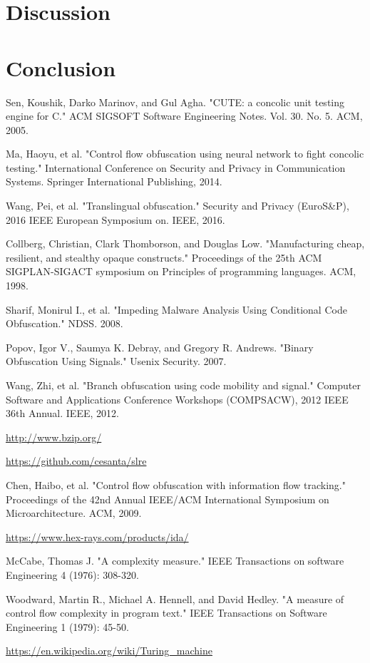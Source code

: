 \documentclass[lnicst]{svmultln}
\begin{document}
\section{Discussion}
\section{Conclusion}

%
%
\begin{thebibliography}{5}

 Sen, Koushik, Darko Marinov, and Gul Agha. "CUTE: a concolic unit testing engine for C." ACM SIGSOFT Software Engineering Notes. Vol. 30. No. 5. ACM, 2005.

 Ma, Haoyu, et al. "Control flow obfuscation using neural network to fight concolic testing." International Conference on Security and Privacy in Communication Systems. Springer International Publishing, 2014.

 Wang, Pei, et al. "Translingual obfuscation." Security and Privacy (EuroS\&P), 2016 IEEE European Symposium on. IEEE, 2016.

 Collberg, Christian, Clark Thomborson, and Douglas Low. "Manufacturing cheap, resilient, and stealthy opaque constructs." Proceedings of the 25th ACM SIGPLAN-SIGACT symposium on Principles of programming languages. ACM, 1998.

 Sharif, Monirul I., et al. "Impeding Malware Analysis Using Conditional Code Obfuscation." NDSS. 2008.

 Popov, Igor V., Saumya K. Debray, and Gregory R. Andrews. "Binary Obfuscation Using Signals." Usenix Security. 2007.

 Wang, Zhi, et al. "Branch obfuscation using code mobility and signal." Computer Software and Applications Conference Workshops (COMPSACW), 2012 IEEE 36th Annual. IEEE, 2012.

 \url{http://www.bzip.org/}

 \url{https://github.com/cesanta/slre}

 Chen, Haibo, et al. "Control flow obfuscation with information flow tracking." Proceedings of the 42nd Annual IEEE/ACM International Symposium on Microarchitecture. ACM, 2009.

 \url{https://www.hex-rays.com/products/ida/}

 McCabe, Thomas J. "A complexity measure." IEEE Transactions on software Engineering 4 (1976): 308-320.

 Woodward, Martin R., Michael A. Hennell, and David Hedley. "A measure of control flow complexity in program text." IEEE Transactions on Software Engineering 1 (1979): 45-50.

 \url{https://en.wikipedia.org/wiki/Turing_machine}


\end{thebibliography}
%
\end{document}
